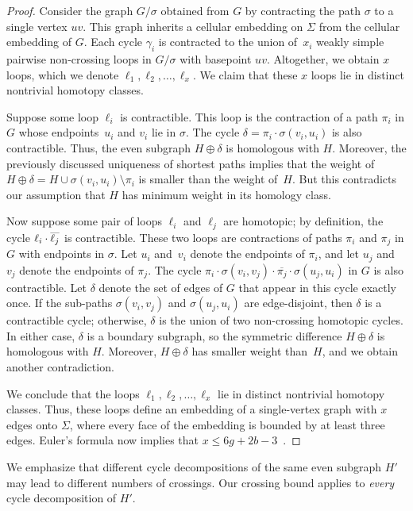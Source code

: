 \documentclass[letterpaper,review]{siamart190516}
\def\reverse#1{\smash{\overline{#1}}}
\def\modified#1{\color{blue}#1 \color{black}}
\begin{document}
\begin{proof}
Consider the graph $G/\sigma$ obtained from $G$ by contracting the path $\sigma$ to a single vertex $uv$.  This graph inherits a cellular embedding on $\Sigma$ from the cellular embedding of $G$.  Each cycle $\gamma_i$ is contracted to the union of~$x_i$ weakly simple \modified{pairwise} non-crossing loops in $G/\sigma$ with basepoint $uv$.  Altogether, we obtain $x$ loops, which we denote $\ell_1, \ell_2, \dots, \ell_x$.  We claim that these $x$ loops lie in distinct nontrivial homotopy classes.

Suppose some loop $\ell_i$ is contractible.  This loop is the contraction of a path $\pi_i$ in $G$
whose endpoints~$u_i$ and $v_i$ lie in $\sigma$.  The cycle $\delta = \pi_i \cdot \sigma(v_i,u_i)$
is also contractible.  Thus, the even subgraph $H\oplus\delta$ is homologous with $H$.  Moreover,
the previously discussed uniqueness of shortest paths implies that the weight of $H\oplus\delta = H \cup \sigma(v_i,u_i) \setminus \pi_i$ is smaller than the weight of~$H$.  But this contradicts our assumption that $H $ has minimum weight in its homology class.

Now suppose some pair of loops $\ell_i$ and $\ell_j$ are homotopic; by definition, the cycle $\ell_i\cdot\reverse{\ell_j}$ is contractible.  These two loops are contractions of paths $\pi_i$ and $\pi_j$ in $G$ with endpoints in $\sigma$.  Let $u_i$ and~$v_i$ denote the endpoints of $\pi_i$, and let $u_j$ and~$v_j$ denote the endpoints of $\pi_j$.  The cycle $\pi_i \cdot \sigma(v_i,v_j) \cdot \overline{\pi_j} \cdot \sigma(u_j, u_i)$ in $G$ is also contractible.  Let $\delta$ denote the set of edges of $G$ that appear in this cycle exactly once.  If the sub-paths $\sigma(v_i,v_j)$ and $\sigma(u_j, u_i)$ are edge-disjoint, then $\delta$ is a contractible cycle; otherwise, $\delta$ is the union of two non-crossing homotopic cycles.  In either case, $\delta$ is a boundary subgraph, so the symmetric difference $H\oplus\delta$ is homologous with $H$.  Moreover, $H\oplus\delta$ has smaller weight than~$H$, and we obtain another contradiction.

We conclude that the loops $\ell_1, \ell_2, \dots, \ell_x$ lie in distinct nontrivial homotopy classes.  Thus, these loops define an embedding of a single-vertex graph with $x$ edges onto $\Sigma$, where every face of the embedding is bounded by at least three edges.  Euler's formula now implies that $x\le 6g+2b-3$~\cite[Lemma~2.1]{ccelw-scsih-08}.
\end{proof}

We emphasize that different cycle decompositions of the same even subgraph $H'$ may lead to
different numbers of crossings.  Our crossing bound applies to \emph{every} cycle decomposition of
$H'$.
\end{document}

